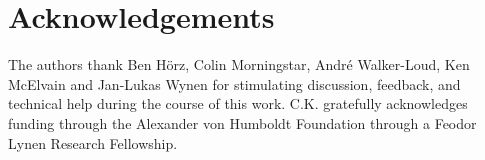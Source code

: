 \section*{Acknowledgements}\label{sec:acknowledgements}

The authors thank
Ben H\"{o}rz,
Colin Morningstar,
Andr\'{e} Walker-Loud,
Ken McElvain
and
Jan-Lukas Wynen
for stimulating discussion, feedback, and technical help during the course of this work.
C.K. gratefully acknowledges funding through the Alexander von Humboldt Foundation through a Feodor Lynen Research Fellowship.
